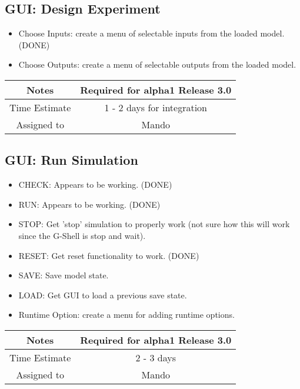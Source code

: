 \documentclass[12pt]{article}
\begin{document}
\subsection{GUI: Design Experiment}
\begin{itemize}
\item Choose Inputs: create a menu of selectable inputs from the loaded model. (DONE)
\item Choose Outputs: create a menu of selectable outputs from the loaded model.
\end{itemize}

{
  \vspace{5mm}
  \centering
  \begin{tabular}{|c|c|}
    \hline
    Notes
    & Required for alpha1 Release 3.0 \\
    \hline
    Time Estimate
    & 1 - 2 days for integration \\
    \hline
    Assigned to
    & Mando \\
    \hline
  \end{tabular}
}


\subsection{GUI: Run Simulation}
\begin{itemize}
\item CHECK: Appears to be working. (DONE)
\item RUN: Appears to be working. (DONE)      
\item STOP: Get 'stop' simulation to properly work (not sure how this
  will work since the G-Shell is stop and wait).
\item RESET: Get reset functionality to work. (DONE)
\item SAVE: Save model state. 
\item LOAD: Get GUI to load a previous save state.
\item Runtime Option: create a menu for adding runtime options.
\end{itemize}

{
  \vspace{5mm}
  \centering
  \begin{tabular}{|c|c|}
    \hline
    Notes
    & Required for alpha1 Release 3.0 \\
    \hline
    Time Estimate
    & 2 - 3 days \\
    \hline
    Assigned to
    & Mando \\
    \hline
  \end{tabular}
}
\end{document}
